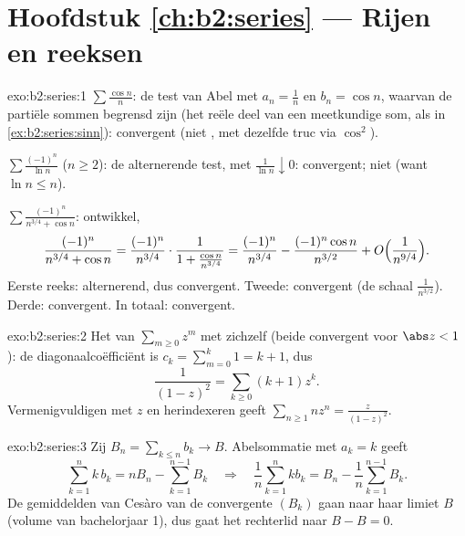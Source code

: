 \section*{Hoofdstuk \ref{ch:b2:series} --- Rijen en reeksen}

\begin{solution}{exo:b2:series:1}
$\sum\frac{\cos n}{n}$: de test van Abel met $a_n = \frac1n$ en
$b_n = \cos n$, waarvan de partiële sommen begrensd zijn (het reële
deel van een meetkundige som, als in \cref{ex:b2:series:sinn}):
convergent (niet , met dezelfde truc via $\cos^2$).

$\sum \frac{(-1)^n}{\ln n}$ ($n \geq 2$): de alternerende test, met
$\frac{1}{\ln n} \downarrow 0$: convergent; niet  (want
$\ln n \leq n$).

$\sum \frac{(-1)^n}{n^{3/4} + \cos n}$: ontwikkel,
\[
\frac{(-1)^n}{n^{3/4} + \cos n}
= \frac{(-1)^n}{n^{3/4}}\cdot
\frac{1}{1 + \frac{\cos n}{n^{3/4}}}
= \frac{(-1)^n}{n^{3/4}}
- \frac{(-1)^n\cos n}{n^{3/2}} + O\Bigl(\frac{1}{n^{9/4}}\Bigr).
\]
Eerste reeks: alternerend, dus convergent. Tweede: 
convergent (de schaal $\frac{1}{n^{3/2}}$). Derde: 
convergent. In totaal: convergent.
\end{solution}

\begin{solution}{exo:b2:series:2}
Het  van $\sum_{m\geq0} z^m$ met zichzelf (beide
 convergent voor $\abs z < 1$): de diagonaalcoëfficiënt is
$c_k = \sum_{m=0}^{k} 1 = k + 1$, dus
\[
\frac{1}{(1-z)^2} = \sum_{k\geq0} (k+1)z^k .
\]
Vermenigvuldigen met $z$ en herindexeren geeft $\sum_{n \geq 1} n
z^n = \frac{z}{(1-z)^2}$.
\end{solution}

\begin{solution}{exo:b2:series:3}
Zij $B_n = \sum_{k \leq n} b_k \to B$. Abelsommatie met $a_k = k$
geeft
\[
\sum_{k=1}^{n} k\,b_k = n B_n - \sum_{k=1}^{n-1} B_k
\quad\Longrightarrow\quad
\frac1n \sum_{k=1}^{n} k b_k = B_n - \frac{1}{n}\sum_{k=1}^{n-1}
B_k .
\]
De gemiddelden van Cesàro van de convergente $(B_k)$ gaan naar haar
limiet $B$ (volume van bachelorjaar 1), dus gaat het rechterlid
naar $B - B = 0$.
\end{solution}

